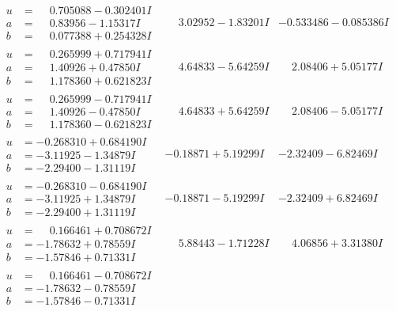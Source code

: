 \documentclass[1p]{elsarticle_modified}
\theoremstyle{definition}
\begin{document}
$$\begin{array}{c|c|c}
\begin{aligned}
u &= \phantom{-}0.705088 - 0.302401 I \\
a &= \phantom{-}0.83956 - 1.15317 I \\
b &= \phantom{-}0.077388 + 0.254328 I\end{aligned}
 & \phantom{-}3.02952 - 1.83201 I & -0.533486 - 0.085386 I \\ \hline\begin{aligned}
u &= \phantom{-}0.265999 + 0.717941 I \\
a &= \phantom{-}1.40926 + 0.47850 I \\
b &= \phantom{-}1.178360 + 0.621823 I\end{aligned}
 & \phantom{-}4.64833 - 5.64259 I & \phantom{-}2.08406 + 5.05177 I \\ \hline\begin{aligned}
u &= \phantom{-}0.265999 - 0.717941 I \\
a &= \phantom{-}1.40926 - 0.47850 I \\
b &= \phantom{-}1.178360 - 0.621823 I\end{aligned}
 & \phantom{-}4.64833 + 5.64259 I & \phantom{-}2.08406 - 5.05177 I \\ \hline\begin{aligned}
u &= -0.268310 + 0.684190 I \\
a &= -3.11925 - 1.34879 I \\
b &= -2.29400 - 1.31119 I\end{aligned}
 & -0.18871 + 5.19299 I & -2.32409 - 6.82469 I \\ \hline\begin{aligned}
u &= -0.268310 - 0.684190 I \\
a &= -3.11925 + 1.34879 I \\
b &= -2.29400 + 1.31119 I\end{aligned}
 & -0.18871 - 5.19299 I & -2.32409 + 6.82469 I \\ \hline\begin{aligned}
u &= \phantom{-}0.166461 + 0.708672 I \\
a &= -1.78632 + 0.78559 I \\
b &= -1.57846 + 0.71331 I\end{aligned}
 & \phantom{-}5.88443 - 1.71228 I & \phantom{-}4.06856 + 3.31380 I \\ \hline\begin{aligned}
u &= \phantom{-}0.166461 - 0.708672 I \\
a &= -1.78632 - 0.78559 I \\
b &= -1.57846 - 0.71331 I\end{aligned}

\end{array}$$
\end{document}
